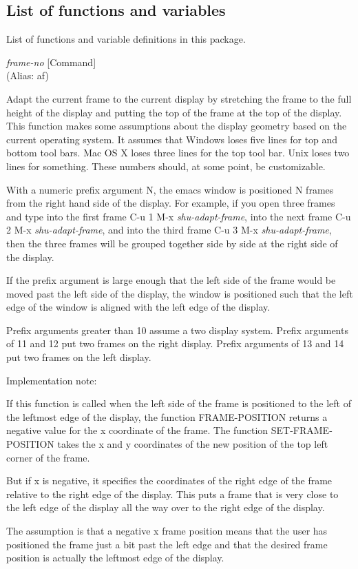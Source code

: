\subsection{List of functions and variables}

List of functions and variable definitions in this package.



\vspace{1em}
\noindent
{}
\usebox{\funcname}\emph{frame-no}
 \hfill [Command]\\%
 (Alias: af)

\begin{doc-string}
Adapt the current frame to the current display by stretching the frame to the
full height of the display and putting the top of the frame at the top of the
display.  This function makes some assumptions about the display geometry based
on the current operating system.  It assumes that Windows loses five lines for
top and bottom tool bars.  Mac OS X loses three lines for the top tool bar.
Unix loses two lines for something.  These numbers should, at some point, be
customizable.

With a numeric prefix argument N, the emacs window is positioned N frames from
the right hand side of the display.  For example, if you open three frames and
type into the first frame C-u 1 M-x \emph{shu-adapt-frame}, into the next frame
C-u 2 M-x \emph{shu-adapt-frame}, and into the third frame C-u 3 M-x \emph{shu-adapt-frame},
then the three frames will be grouped together side by side at the right side of
the display.

If the prefix argument is large enough that the left side of the frame would be
moved past the left side of the display, the window is positioned such that the
left edge of the window is aligned with the left edge of the display.

Prefix arguments greater than 10 assume a two display system.  Prefix arguments
of 11 and 12 put two frames on the right display.  Prefix arguments of 13 and
14 put two frames on the left display.

Implementation note:

If this function is called when the left side of the frame is positioned to the
left of the leftmost edge of the display, the function FRAME-POSITION returns a
negative value for the x coordinate of the frame.  The function
SET-FRAME-POSITION takes the x and y coordinates of the new position of the top
left corner of the frame.

But if x is negative, it specifies the coordinates of the right edge of the
frame relative to the right edge of the display.  This puts a frame that is very
close to the left edge of the display all the way over to the right edge of the
display.

The assumption is that a negative x frame position means that the user has
positioned the frame just a bit past the left edge and that the desired frame
position is actually the leftmost edge of the display.
\end{doc-string}

